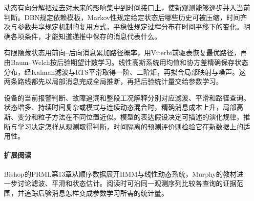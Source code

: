 动态有向分解把过去对未来的影响集中到时间接口上，使新观测能够逐步并入当前判断。DBN规定依赖模板，Markov性规定给定状态后哪些历史可被压缩，时间齐次与参数共享规定机制的复用方式，平稳性规定过程分布在时间平移下的变化。明确各项条件，才能知道递推中保存的消息代表什么。

有限隐藏状态用前向--后向消息累加路径概率，用Viterbi前驱表恢复最优路径，再由Baum--Welch按后验期望计数学习。线性高斯系统用均值和协方差精确保存状态分布，经Kalman滤波与RTS平滑取得一阶、二阶矩，再拟合局部映射与噪声。这两条路线都先以局部消息完成全局推断，再把后验统计量交给参数学习。

设备的当前报警判断、故障追溯和整段工况解释分别对应滤波、平滑和路径查询。状态增多、持续时间复杂或模式与连续动态混合时，精确消息成本上升，局部高斯、变分和粒子方法在不同位置近似。模型的表达假设决定可描述的演化规律，推断与学习决定怎样从观测取得判断，时间隔离的预测评价则检验它在新数据上的适用性。

\paragraph{扩展阅读}
Bishop的PRML第13章从顺序数据展开HMM与线性动态系统，Murphy的教材进一步讨论滤波、平滑和状态估计。阅读时可沿同一观测序列比较各查询的证据范围，并追踪后验消息怎样变成参数学习所需的统计量。
